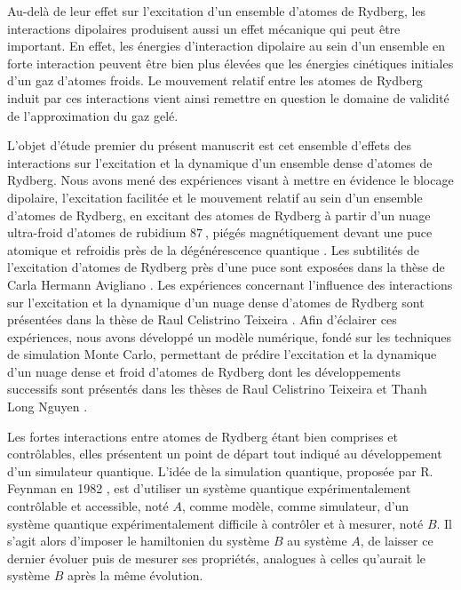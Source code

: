 Au-delà de leur effet sur l'excitation d'un ensemble d'atomes de Rydberg, les interactions dipolaires produisent aussi un effet mécanique qui peut être important.
En effet, les énergies d'interaction dipolaire au sein d'un ensemble en forte interaction peuvent être bien plus élevées que les énergies cinétiques initiales d'un gaz d'atomes froids.
Le mouvement relatif entre les atomes de Rydberg induit par ces interactions vient ainsi remettre en question le domaine de validité de l'approximation du gaz gelé.

L'objet d'étude premier du présent manuscrit est cet ensemble d'effets des interactions sur l'excitation et la dynamique d'un ensemble dense d'atomes de Rydberg.
Nous avons mené des expériences visant à mettre en évidence le blocage dipolaire, l'excitation facilitée et le mouvement relatif au sein d'un ensemble d'atomes de Rydberg, en excitant des atomes de Rydberg à partir d'un nuage ultra-froid d'atomes de rubidium $\SI{87}{}$, piégés magnétiquement devant une puce atomique et refroidis près de la dégénérescence quantique \cite{ENS_CHIPSPECTRO14,ENS_CHIPINTERACTION15}.
Les subtilités de l'excitation d'atomes de Rydberg près d'une puce sont exposées dans la thèse de Carla Hermann Avigliano \cite{PHD_HERMANN}.
Les expériences concernant l'influence des interactions sur l'excitation et la dynamique d'un nuage dense d'atomes de Rydberg sont présentées dans la thèse de Raul Celistrino Teixeira \cite{PHD_CELISTRINO}.
Afin d'éclairer ces expériences, nous avons développé un modèle numérique, fondé sur les techniques de simulation Monte Carlo, permettant de prédire l'excitation et la dynamique d'un nuage dense et froid d'atomes de Rydberg dont les développements successifs sont présentés dans les thèses de Raul Celistrino Teixeira \cite{PHD_CELISTRINO} et Thanh Long Nguyen \cite{PHD_NGUYEN}.

\bigskip
Les fortes interactions entre atomes de Rydberg étant bien comprises et contrôlables, elles présentent un point de départ tout indiqué au développement d'un simulateur quantique.
L'idée de la simulation quantique, proposée par R. Feynman en 1982 \cite{Feynman1982}, est d'utiliser un système quantique expérimentalement contrôlable et accessible, noté $A$, comme modèle, comme simulateur, d'un système quantique expérimentalement difficile à contrôler et à mesurer, noté $B$.
Il s'agit alors d'imposer le hamiltonien du système $B$ au système $A$, de laisser ce dernier évoluer puis de mesurer ses propriétés, analogues à celles qu'aurait le système $B$ après la même évolution.

